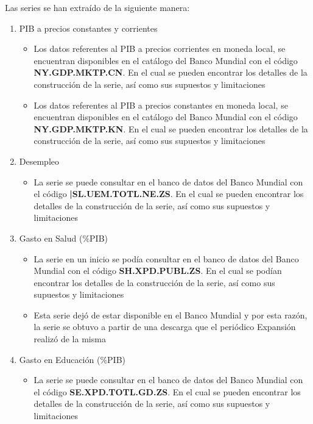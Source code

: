 

Las series se han extraído de la siguiente manera:

\begin{enumerate}
		\item PIB a precios constantes y corrientes
		\begin{itemize}
		\item Los datos referentes al PIB a precios corrientes en moneda local,  se encuentran disponibles en el catálogo del Banco Mundial con el código \textbf{NY.GDP.MKTP.CN}. En el cual se pueden encontrar los detalles de la construcción de la serie, así como sus supuestos y limitaciones
		\item Los datos referentes al PIB a precios constantes en moneda local,  se encuentran disponibles en el catálogo del Banco Mundial con el código \textbf{NY.GDP.MKTP.KN}. En el cual se pueden encontrar los detalles de la construcción de la serie, así como sus supuestos y limitaciones
		\end{itemize}
		\item Desempleo
		\begin{itemize}
		\item La serie se puede consultar en el banco de datos del Banco Mundial con el código \textbf{|SL.UEM.TOTL.NE.ZS}. En el cual se pueden encontrar los detalles de la construcción de la serie, así como sus supuestos y limitaciones
		\end{itemize}
	\item Gasto en Salud (\%PIB)
			\begin{itemize}
				\item La serie en un inicio se podía consultar en el banco de datos del Banco Mundial con el código \textbf{SH.XPD.PUBL.ZS}. En el cual se podían encontrar los detalles de la construcción de la serie, así como 						sus supuestos y limitaciones
				\item Esta serie dejó de estar disponible en el Banco Mundial y por esta razón, la serie se obtuvo a partir de una descarga que el periódico Expansión realizó de la misma 
			\end{itemize}
	\item Gasto en Educación (\%PIB)
	\begin{itemize}
				\item La serie se puede consultar en el banco de datos del Banco Mundial con el código \textbf{SE.XPD.TOTL.GD.ZS}. En el cual se pueden encontrar los detalles de la construcción de la serie, así como sus 						supuestos y limitaciones

\end{itemize}
\end{enumerate}
